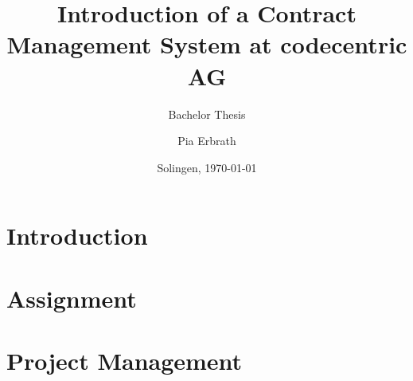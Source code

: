
\usepackage{sebithesistitle}
\usepackage{rotate}
\usepackage[toc,page]{appendix}
\usepackage{eurosym}
\usepackage{color, colortbl}

\title{Introduction of a Contract Management System \newline at codecentric AG}
\subtitle{Bachelor Thesis}
\author{Pia Erbrath}
\def\place{Solingen}
\date{\place, \today}

\def\documentname{Interim Report for Bachelor Thesis}
\def\studentname{Pia Erbrath}
\def\snumber{2300869}
\def\course{Informatics - Software Engineering}
\def\period{February 2018 - July 2018}
\def\companyname{codecentric AG}
\def\companyaddress{Hochstr. 11}
\def\companypostcodecity{42697, Solingen}
\def\companycountry{Germany}
\def\companycoach{Niko Bl\"attermann}
\def\companycoachmail{niko.blaettermann@codecentric.de}
\def\universitytutor{Ferd van Odenhoven}
\def\universitytutormail{f.vanodenhoven@fontys.nl}
\def\examinator{Marco Langenhuizen}
\def\externalexpert{Professional B}
\def\hasnda{no}



\makeglossaries


	\maketitle
	\pagestyle{plain}
	
	\newpage
	
	\newpage
	
	\newpage
	
	\tableofcontents
	\listoftables
	\listoffigures
	\newpage
	
	\newpage
	\pagestyle{ownstyle}
	\chapter{Introduction}
	
	
	\chapter{Assignment}
	
	
	\chapter{Project Management}
	
	
